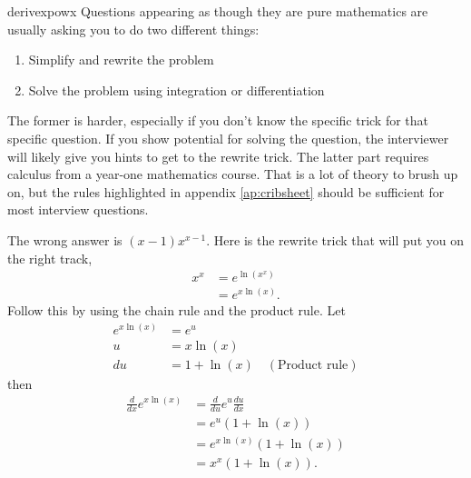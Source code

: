 \begin{answer}{derivexpowx}
Questions appearing as though they are pure mathematics are usually asking you to do two different things:
\begin{enumerate}
  \item Simplify and rewrite the problem
  \item Solve the problem using integration or differentiation
\end{enumerate}
The former is harder, especially if you don't know the specific trick for that specific question.
If you show potential for solving the question, the interviewer will likely give you hints to get to the rewrite trick.
The latter part requires calculus from a year-one mathematics course.
That is a lot of theory to brush up on, but the rules highlighted in appendix \ref{ap:cribsheet} should be sufficient for most interview questions.

The wrong answer is $(x-1) x^{x-1}$.
Here is the rewrite trick that will put you on the right track,
\begin{align*}
  x^x &= e^{ \ln(x^x )} \\
      &= e^{x \ln(x )}
      \text{.}
\end{align*}
Follow this by using the chain rule and the product rule. Let
\begin{align*}
      e^{x \ln(x )} &=  e^{u} \\
      u &= x \ln(x) \\
     du &= 1 + \ln(x) \quad (\text{Product rule})
\end{align*}
then
\begin{align*}
\frac{d}{dx} e^{x \ln(x )} &= \frac{d}{du} e^{u}  \frac{du}{dx} \\
                           &=  e^{u} (1 + \ln(x)) \\
                           &=  e^{x \ln(x)} (1 + \ln(x)) \\
                           &=  x^x (1 + \ln(x))
\text{.}
\end{align*}
\end{answer}
